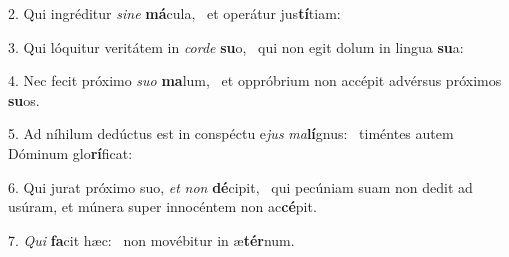 2. Qui ingréditur \textit{si}\textit{ne} \textbf{má}cula, \ast\  et operátur jus\textbf{tí}tiam:\

3. Qui lóquitur veritátem in \textit{cor}\textit{de} \textbf{su}o, \ast\  qui non egit dolum in lingua \textbf{su}a:\

4. Nec fecit próximo \textit{su}\textit{o} \textbf{ma}lum, \ast\  et oppróbrium non accépit advérsus próximos \textbf{su}os.\

5. Ad níhilum dedúctus est in conspéctu e\textit{jus} \textit{ma}\textbf{lí}gnus: \ast\  timéntes autem Dóminum glo\textbf{rí}ficat:\

6. Qui jurat próximo suo, \textit{et} \textit{non} \textbf{dé}cipit, \ast\  qui pecúniam suam non dedit ad usúram, et múnera super innocéntem non ac\textbf{cé}pit.\

7. \textit{Qui} \textbf{fa}cit hæc: \ast\  non movébitur in æ\textbf{tér}num.\

